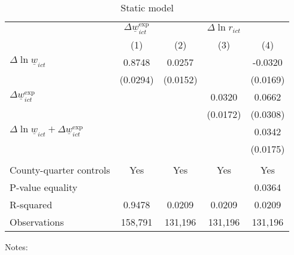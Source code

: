 \begin{table}
    \caption{Static model}
    \label{tab:static}

    \begin{tabular}{l*{4}{c}}
    \toprule
     & \multicolumn{1}{c}{$\Delta \underline{w}_{ict}^{\text{exp}}$}
     & \multicolumn{3}{c}{$\Delta \ln r_{ict}$}                                  \\ \cmidrule(lr){2-2}\cmidrule(lr){3-5}
     & \multicolumn{1}{c}{(1)} & \multicolumn{1}{c}{(2)} 
     & \multicolumn{1}{c}{(3)} & \multicolumn{1}{c}{(4)}                         \\ \midrule
    $\Delta \ln \underline{w}_{ict}$          &  0.8748  &  0.0257  &       &  -0.0320     \\
                                              & (0.0294) & (0.0152) &       & (0.0169)    \\
    $\Delta \underline{w}_{ict}^{\text{exp}}$ &       &       &  0.0320  & 0.0662      \\
                                              &       &       & (0.0172) & (0.0308)    \\ \midrule
    $\Delta \ln \underline{w}_{ict}+
      \Delta \underline{w}_{ict}^{\text{exp}}$&       &       &       &  0.0342     \\
                                              &       &       &       & (0.0175)    \\
                                              &       &       &       &          \\ \midrule
    County-quarter controls                   &  Yes  & Yes   & Yes   & Yes      \\
    P-value equality                          &       &       &       & 0.0364      \\
    R-squared                                 &  0.9478  &  0.0209  &  0.0209  & 0.0209      \\
    Observations                              & 158,791  & 131,196  & 131,196  & 131,196     \\\bottomrule
    \end{tabular}

    \begin{minipage}{.95\textwidth} \footnotesize
        \vspace{2mm}
        Notes: 
    \end{minipage}
\end{table}
